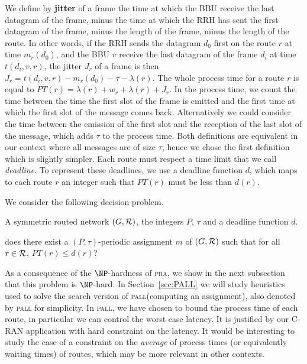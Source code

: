 \documentclass[10pt]{article}
\newcommand\pall{\textsc{pall}\xspace}
\newcommand\pra{\textsc{pra}\xspace}
\begin{document}
      We define by {\bf jitter} of a frame the time at which the BBU receive the last datagram of the frame, minus the time at which the RRH has sent the first datagram of the frame, minus the length of the frame, minus the length of the route. In other words, if the RRH sends the datagram $d_0$ first on the route $r$ at time $m_r(d_0)$, and the BBU $v$ receive the last datagram of the frame $d_i$ at time $t(d_i,v,r)$, the jitter $J_r$ of a frame is then $J_r = t(d_i,v,r) - m_r(d_0) - \tau- \lambda(r)$.
      The whole process time for a route $r$ is equal to $PT(r)=\lambda(r)+ w_r+\lambda(r) + J_r$.      
      In the process time, we count the time between the time the first slot of the frame is emitted and the first time at which the first slot of the message comes back. Alternatively we could consider the time between the emission of the first slot and the reception of the last slot of the message, which adds $\tau$ to the process time. Both definitions are equivalent in our context where all messages are of size $\tau$, hence we chose the first definition which is slightly simpler. 
      Each route must respect a time limit that we call \emph{deadline}. To represent these deadlines, 
      we use a deadline function $d$, which maps to each route $r$ an integer such that $PT(r)$ must be less than $d(r)$.
      
      We consider the following decision problem.

      \noindent {\bf Periodic Assignment for Low Latency (\pall)} 

        A symmetric routed network $(G,{\cal R})$, the integers $P$, $\tau$ and a deadline function $d$.
      
       does there exist a $(P,\tau)$-periodic assignment $m$ of $(G,{\cal R})$ such that for all $r \in {\cal R}$, $PT(r) \leq d(r)$?

      As a consequence of the $\NP$-hardness of \pra, we show in the next subsection that this problem is $\NP$-hard. 
      In Section~\ref{sec:PALL} we will study heuristics used to solve the search version of \pall (computing an assignment), also denoted by \pall for simplicity. In \pall, we have chosen to bound the process time of each route, in particular we can control the worst case latency. It is justified by our C-RAN application with hard constraint on the latency. It would be interesting to study the case of a constraint on the \emph{average} of process times (or equivalently waiting times) of routes, which may be more relevant in other contexts.
\end{document}
